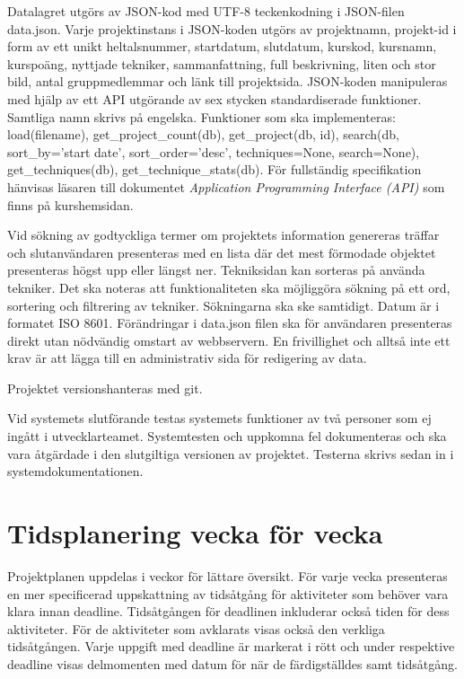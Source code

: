 \documentclass{TDP003mall}
\begin{document}
Datalagret utgörs av JSON-kod med UTF-8 teckenkodning i JSON-filen data.json. Varje projektinstans i JSON-koden utgörs av projektnamn, projekt-id i form av ett unikt heltalsnummer, startdatum, slutdatum, kurskod, kursnamn, kurspoäng, nyttjade tekniker, sammanfattning, full beskrivning, liten och stor bild, antal gruppmedlemmar och länk till projektsida. JSON-koden manipuleras med hjälp av ett API utgörande av sex stycken standardiserade funktioner. Samtliga namn skrivs på engelska. Funktioner som ska implementeras: load(filename), get\_project\_count(db), get\_project(db, id), search(db, sort\_by='start date', sort\_order='desc', techniques=None, search=None), get\_techniques(db), get\_technique\_stats(db). För fullständig specifikation hänvisas läsaren till dokumentet \textit{Application Programming Interface (API)} som finns på kurshemsidan.

Vid sökning av godtyckliga termer om projektets information genereras träffar och slutanvändaren presenteras med en lista där det mest förmodade objektet presenteras högst upp eller längst ner. Tekniksidan kan sorteras på använda tekniker. Det ska noteras att funktionaliteten ska möjliggöra sökning på ett ord, sortering och filtrering av tekniker. Sökningarna ska ske samtidigt. Datum är i formatet ISO 8601. Förändringar i data.json filen ska för användaren presenteras direkt utan nödvändig omstart av webbservern. En frivillighet och alltså inte ett krav är att lägga till en administrativ sida för redigering av data.

Projektet versionshanteras med git.

Vid systemets slutförande testas systemets funktioner av två personer som ej ingått i utvecklarteamet. Systemtesten och uppkomna fel dokumenteras och ska vara åtgärdade i den slutgiltiga versionen av projektet. Testerna skrivs sedan in i systemdokumentationen.


\section{Tidsplanering vecka för vecka}
Projektplanen uppdelas i veckor för lättare översikt. För varje vecka presenteras en mer specificerad uppskattning av tidsåtgång för aktiviteter som behöver vara klara innan deadline. Tidsåtgången för deadlinen inkluderar också tiden för dess aktiviteter. För de aktiviteter som avklarats visas också den verkliga tidsåtgången. Varje uppgift med deadline är markerat i rött och under respektive deadline visas delmomenten med datum för när de färdigställdes samt tidsåtgång.
\end{document}
